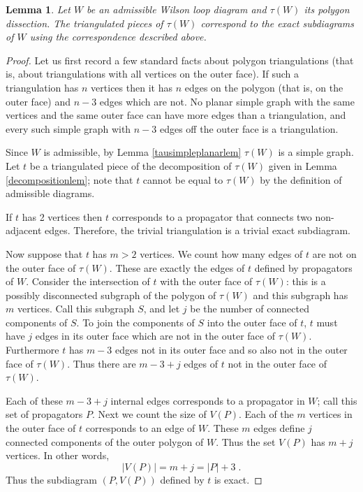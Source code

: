\documentclass[11pt]{article}
\newtheorem{lem}[thm]{Lemma}
\theoremstyle{remark}
\theoremstyle{definition}
\begin{document}
\begin{lem}\label{lem triang to exact}
  Let $W$ be an admissible Wilson loop diagram and $\tau(W)$ its polygon dissection.  The triangulated pieces of $\tau(W)$ correspond to the exact subdiagrams of $W$ using the correspondence described above.
\end{lem}

\begin{proof}
Let us first record a few standard facts about polygon triangulations (that is, about triangulations with all vertices on the outer face).  If such a triangulation has $n$ vertices then it has $n$ edges on the polygon (that is, on the outer face) and $n-3$ edges which are not.  No planar simple graph with the same vertices and the same outer face can have more edges than a triangulation, and every such simple graph with $n-3$ edges off the outer face is a triangulation.

Since $W$ is admissible, by Lemma \ref{tausimpleplanarlem} $\tau(W)$ is a simple graph. Let $t$ be a triangulated piece of the decomposition of $\tau(W)$ given in Lemma \ref{decompositionlem}; note that $t$ cannot be equal to $\tau(W)$ by the definition of admissible diagrams.

If $t$ has 2 vertices then $t$ corresponds to a propagator that connects two non-adjacent edges. Therefore, the trivial triangulation is a trivial exact subdiagram.

Now suppose that $t$ has $m>2$ vertices.  We count how many edges of $t$ are not on the outer face of $\tau(W)$.  These are exactly the edges of $t$ defined by propagators of $W$. Consider the intersection of $t$ with the outer face of $\tau(W)$: this is a possibly disconnected subgraph of the polygon of $\tau(W)$ and this subgraph has $m$ vertices. Call this subgraph $S$, and let $j$ be the number of connected components of $S$.   To join the components of $S$ into the outer face of $t$, $t$ must have $j$ edges in its outer face which are not in the outer face of $\tau(W)$.  Furthermore $t$ has $m-3$ edges not in its outer face and so also not in the outer face of $\tau(W)$.  Thus there are $m-3+j$ edges of $t$ not in the outer face of $\tau(W)$.

Each of these $m-3+j$ internal edges corresponds to a propagator in $W$; call this set of propagators $P$.  Next we count the size of $V(P)$.  Each of the $m$ vertices in the outer face of $t$ corresponds to an edge of $W$. These $m$ edges define $j$ connected components of the outer polygon of $W$. Thus the set $V(P)$ has $m+j$ vertices.  In other words, 
\[|V(P)| = m+j = |P| +3\;.\]
Thus the subdiagram $(P,V(P))$ defined by $t$ is exact.



\end{proof}
\end{document}
